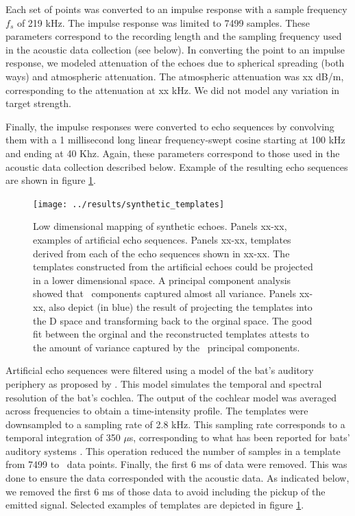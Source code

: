 \documentclass[preprint,5p]{elsarticle}
\begin{document}
Each set of points was converted to an impulse response with a sample frequency $f_s$ of 219 kHz. The impulse response was limited to 7499 samples. These parameters correspond to the recording length and the sampling frequency used in the acoustic data collection (see below). In converting the point to an impulse response, we modeled attenuation of the echoes due to spherical spreading (both ways) and atmospheric attenuation. The atmospheric attenuation was xx dB/m, corresponding to the attenuation at xx kHz. We did not model any variation in target strength.

Finally, the impulse responses were converted to echo sequences by convolving them with a 1 millisecond long linear frequency-swept cosine starting at 100 kHz and ending at 40 Khz. Again, these parameters correspond to those used in the acoustic data collection described below. Example of the resulting echo sequences are shown in figure \ref{fig:synthetictemplates}.

\begin{figure}
	\centering
	\texttt{[image: ../results/synthetic\_templates]}
	\caption{Low dimensional mapping of synthetic echoes. Panels xx-xx, examples of artificial echo sequences. Panels xx-xx, templates derived from each of the echo sequences shown in xx-xx. The templates constructed from the artificial echoes could be projected in a lower dimensional space. A principal component analysis showed that \pca\ components captured almost all variance. Panels xx-xx, also depict (in blue) the result of projecting the templates into the \pca D space and transforming back to the orginal space. The good fit between the orginal and the reconstructed templates attests to the amount of variance captured by the \pca\ principal components.}
	\label{fig:synthetictemplates}
\end{figure}

Artificial echo sequences were filtered using a model of the bat's auditory periphery as proposed by \citet{Wiegrebe2008}. This model simulates the temporal and spectral resolution of the bat's cochlea. The output of the cochlear model was averaged across frequencies to obtain a time-intensity profile. The templates were downsampled to a sampling rate of 2.8 kHz. This sampling rate corresponds to a temporal integration of 350 $\mu$s, corresponding to what has been reported for bats' auditory systems \citep{Wiegrebe1996,Simmons1989}. This operation reduced the number of samples in a template from 7499 to \prepca\ data points. Finally, the first 6 ms of data were removed. This was done to ensure the data corresponded with the acoustic data. As indicated below, we removed the first 6 ms of those data to avoid including the pickup of the emitted signal. Selected examples of templates are depicted in figure \ref{fig:synthetictemplates}.
\end{document}
